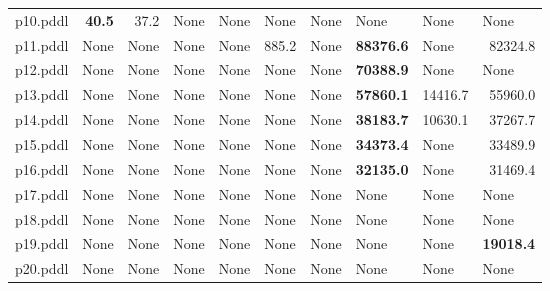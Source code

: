 \documentclass{article}
\begin{document}
\begin{tabular}{@{}lrrrrrrrrr@{}}
p10.pddl & \textbf{40.5} & 37.2 & \multicolumn{1}{|l|}{None} & \multicolumn{1}{|l|}{None} & \multicolumn{1}{|l|}{None} & \multicolumn{1}{|l|}{None} & \multicolumn{1}{|l|}{None} & \multicolumn{1}{|l|}{None} & \multicolumn{1}{|l|}{None} \\
p11.pddl & \multicolumn{1}{|l|}{None} & \multicolumn{1}{|l|}{None} & \multicolumn{1}{|l|}{None} & \multicolumn{1}{|l|}{None} & 885.2 & \multicolumn{1}{|l|}{None} & \textbf{88376.6} & \multicolumn{1}{|l|}{None} & 82324.8 \\
p12.pddl & \multicolumn{1}{|l|}{None} & \multicolumn{1}{|l|}{None} & \multicolumn{1}{|l|}{None} & \multicolumn{1}{|l|}{None} & \multicolumn{1}{|l|}{None} & \multicolumn{1}{|l|}{None} & \textbf{70388.9} & \multicolumn{1}{|l|}{None} & \multicolumn{1}{|l|}{None} \\
p13.pddl & \multicolumn{1}{|l|}{None} & \multicolumn{1}{|l|}{None} & \multicolumn{1}{|l|}{None} & \multicolumn{1}{|l|}{None} & \multicolumn{1}{|l|}{None} & \multicolumn{1}{|l|}{None} & \textbf{57860.1} & 14416.7 & 55960.0 \\
p14.pddl & \multicolumn{1}{|l|}{None} & \multicolumn{1}{|l|}{None} & \multicolumn{1}{|l|}{None} & \multicolumn{1}{|l|}{None} & \multicolumn{1}{|l|}{None} & \multicolumn{1}{|l|}{None} & \textbf{38183.7} & 10630.1 & 37267.7 \\
p15.pddl & \multicolumn{1}{|l|}{None} & \multicolumn{1}{|l|}{None} & \multicolumn{1}{|l|}{None} & \multicolumn{1}{|l|}{None} & \multicolumn{1}{|l|}{None} & \multicolumn{1}{|l|}{None} & \textbf{34373.4} & \multicolumn{1}{|l|}{None} & 33489.9 \\
p16.pddl & \multicolumn{1}{|l|}{None} & \multicolumn{1}{|l|}{None} & \multicolumn{1}{|l|}{None} & \multicolumn{1}{|l|}{None} & \multicolumn{1}{|l|}{None} & \multicolumn{1}{|l|}{None} & \textbf{32135.0} & \multicolumn{1}{|l|}{None} & 31469.4 \\
p17.pddl & \multicolumn{1}{|l|}{None} & \multicolumn{1}{|l|}{None} & \multicolumn{1}{|l|}{None} & \multicolumn{1}{|l|}{None} & \multicolumn{1}{|l|}{None} & \multicolumn{1}{|l|}{None} & \multicolumn{1}{|l|}{None} & \multicolumn{1}{|l|}{None} & \multicolumn{1}{|l|}{None} \\
p18.pddl & \multicolumn{1}{|l|}{None} & \multicolumn{1}{|l|}{None} & \multicolumn{1}{|l|}{None} & \multicolumn{1}{|l|}{None} & \multicolumn{1}{|l|}{None} & \multicolumn{1}{|l|}{None} & \multicolumn{1}{|l|}{None} & \multicolumn{1}{|l|}{None} & \multicolumn{1}{|l|}{None} \\
p19.pddl & \multicolumn{1}{|l|}{None} & \multicolumn{1}{|l|}{None} & \multicolumn{1}{|l|}{None} & \multicolumn{1}{|l|}{None} & \multicolumn{1}{|l|}{None} & \multicolumn{1}{|l|}{None} & \multicolumn{1}{|l|}{None} & \multicolumn{1}{|l|}{None} & \textbf{19018.4} \\
p20.pddl & \multicolumn{1}{|l|}{None} & \multicolumn{1}{|l|}{None} & \multicolumn{1}{|l|}{None} & \multicolumn{1}{|l|}{None} & \multicolumn{1}{|l|}{None} & \multicolumn{1}{|l|}{None} & \multicolumn{1}{|l|}{None} & \multicolumn{1}{|l|}{None} & \multicolumn{1}{|l|}{None} \\
\end{tabular}
\end{document}
